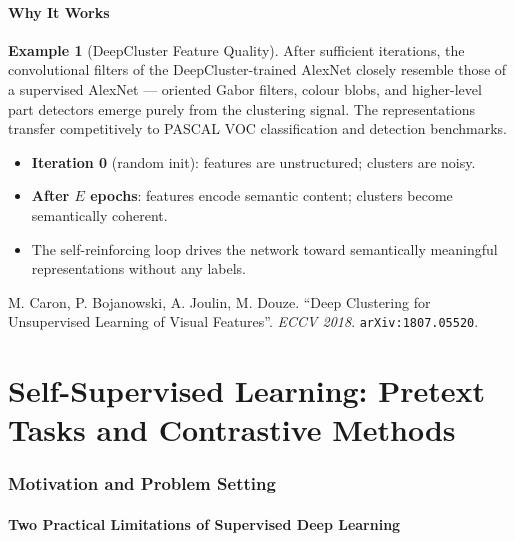 \documentclass[11pt,a4paper]{article}
\theoremstyle{definition}
\newtheorem{example}{Example}[section]
\theoremstyle{plain}
\theoremstyle{remark}
\begin{document}
\subsection{Why It Works}

\begin{example}[DeepCluster Feature Quality]
After sufficient iterations, the convolutional filters of the DeepCluster-trained AlexNet closely resemble those of a supervised AlexNet --- oriented Gabor filters, colour blobs, and higher-level part detectors emerge purely from the clustering signal. The representations transfer competitively to PASCAL VOC classification and detection benchmarks.
\end{example}

\begin{itemize}
    \item \textbf{Iteration 0} (random init): features are unstructured; clusters are noisy.
    \item \textbf{After $E$ epochs}: features encode semantic content; clusters become semantically coherent.
    \item The self-reinforcing loop drives the network toward semantically meaningful representations without any labels.
\end{itemize}

\begin{tcolorbox}[colback=blue!5!white,colframe=blue!60!black,title={Reference}]
M. Caron, P. Bojanowski, A. Joulin, M. Douze. ``Deep Clustering for Unsupervised Learning of Visual Features''. \textit{ECCV 2018}. \texttt{arXiv:1807.05520}.
\end{tcolorbox}



\part{Self-Supervised Learning: Pretext Tasks and Contrastive Methods}

\section{Motivation and Problem Setting}

\subsection{Two Practical Limitations of Supervised Deep Learning}
\end{document}

